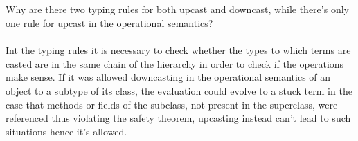 \subsection{}

Why are there two typing rules for both upcast and downcast, while there's only one rule for
upcast in the operational semantics?\\~\\
Int the typing rules it is necessary to check whether the types to which terms are casted are in
the same chain of the hierarchy in order to check if the operations make sense.
If it was allowed downcasting in the operational semantics of an object to a subtype of its
class, the evaluation could evolve to a stuck term in the case that methods or fields of the
subclass, not present in the superclass, were referenced thus violating the safety theorem,
upcasting instead can't lead to such situations hence it's allowed. 
